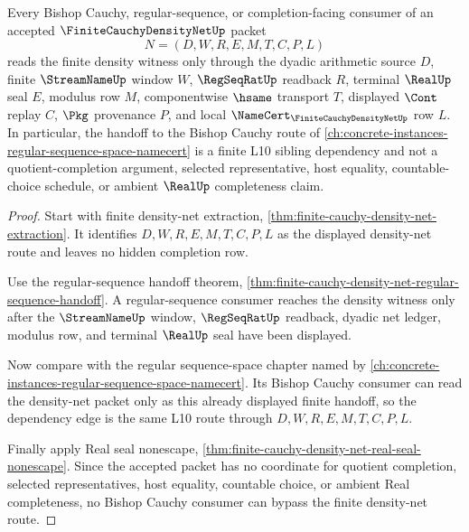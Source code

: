 \begin{theorem}
\label{thm:finite-cauchy-density-net-bishop-cauchy-route}
Every Bishop Cauchy, regular-sequence, or completion-facing consumer of an accepted $\FiniteCauchyDensityNetUp$ packet
$$
N=(D,W,R,E,M,T,C,P,L)
$$
reads the finite density witness only through the dyadic arithmetic source $D$, finite $\StreamNameUp$ window $W$, $\RegSeqRatUp$ readback $R$, terminal $\RealUp$ seal $E$, modulus row $M$, componentwise $\hsame$ transport $T$, displayed $\Cont$ replay $C$, $\Pkg$ provenance $P$, and local $\NameCert_{\FiniteCauchyDensityNetUp}$ row $L$. In particular, the handoff to the Bishop Cauchy route of \autoref{ch:concrete-instances-regular-sequence-space-namecert} is a finite L10 sibling dependency and not a quotient-completion argument, selected representative, host equality, countable-choice schedule, or ambient $\RealUp$ completeness claim.
\end{theorem}
\begin{proof}
Start with finite density-net extraction, \autoref{thm:finite-cauchy-density-net-extraction}. It identifies $D,W,R,E,M,T,C,P,L$ as the displayed density-net route and leaves no hidden completion row.

Use the regular-sequence handoff theorem, \autoref{thm:finite-cauchy-density-net-regular-sequence-handoff}. A regular-sequence consumer reaches the density witness only after the $\StreamNameUp$ window, $\RegSeqRatUp$ readback, dyadic net ledger, modulus row, and terminal $\RealUp$ seal have been displayed.

Now compare with the regular sequence-space chapter named by \autoref{ch:concrete-instances-regular-sequence-space-namecert}. Its Bishop Cauchy consumer can read the density-net packet only as this already displayed finite handoff, so the dependency edge is the same L10 route through $D,W,R,E,M,T,C,P,L$.

Finally apply Real seal nonescape, \autoref{thm:finite-cauchy-density-net-real-seal-nonescape}. Since the accepted packet has no coordinate for quotient completion, selected representatives, host equality, countable choice, or ambient Real completeness, no Bishop Cauchy consumer can bypass the finite density-net route.
\end{proof}
